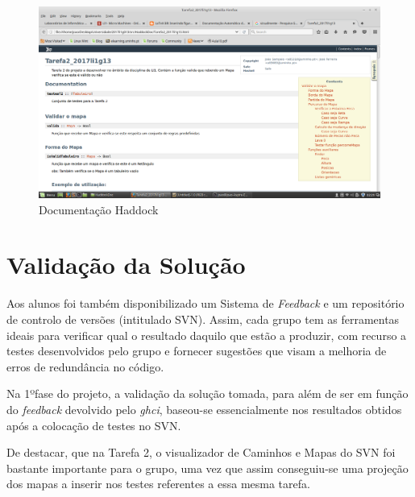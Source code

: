 \documentclass[a4paper]{report} %
\begin{document}
\begin{figure}[h!]
    
    \centering
    \includegraphics[scale= 0.2]{Imagens/haddock.png}
    \caption{Documentação Haddock}

\end{figure}

\chapter{Validação da Solução}

Aos alunos foi também disponibilizado um Sistema de \textit{Feedback} e um repositório de controlo de versões (intitulado SVN). Assim, cada grupo tem as ferramentas ideais para verificar qual o resultado daquilo que estão a produzir, com recurso a testes desenvolvidos pelo grupo e fornecer sugestões que visam a melhoria de erros de redundância no código. 

Na 1ºfase do projeto, a validação da solução tomada, para além de ser em função do \textit{feedback} devolvido pelo \emph{ghci}, baseou-se essencialmente nos resultados obtidos após a colocação de testes no SVN.

De destacar, que na Tarefa 2, o visualizador de Caminhos e Mapas do SVN foi bastante importante para o grupo, uma vez que assim conseguiu-se uma projeção dos mapas a inserir nos testes referentes a essa mesma tarefa.
\end{document}

